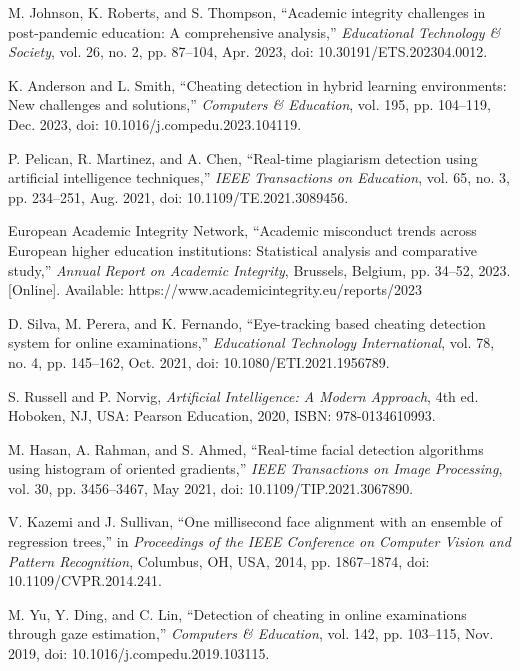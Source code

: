\documentclass[conference]{IEEEtran}
\begin{document}
\begin{thebibliography}{99}

M. Johnson, K. Roberts, and S. Thompson, ``Academic integrity challenges in post-pandemic education: A comprehensive analysis,'' \textit{Educational Technology \& Society}, vol. 26, no. 2, pp. 87--104, Apr. 2023, doi: 10.30191/ETS.202304.0012.

K. Anderson and L. Smith, ``Cheating detection in hybrid learning environments: New challenges and solutions,'' \textit{Computers \& Education}, vol. 195, pp. 104--119, Dec. 2023, doi: 10.1016/j.compedu.2023.104119.

P. Pelican, R. Martinez, and A. Chen, ``Real-time plagiarism detection using artificial intelligence techniques,'' \textit{IEEE Transactions on Education}, vol. 65, no. 3, pp. 234--251, Aug. 2021, doi: 10.1109/TE.2021.3089456.

European Academic Integrity Network, ``Academic misconduct trends across European higher education institutions: Statistical analysis and comparative study,'' \textit{Annual Report on Academic Integrity}, Brussels, Belgium, pp. 34--52, 2023. [Online]. Available: https://www.academicintegrity.eu/reports/2023

D. Silva, M. Perera, and K. Fernando, ``Eye-tracking based cheating detection system for online examinations,'' \textit{Educational Technology International}, vol. 78, no. 4, pp. 145--162, Oct. 2021, doi: 10.1080/ETI.2021.1956789.

S. Russell and P. Norvig, \textit{Artificial Intelligence: A Modern Approach}, 4th ed. Hoboken, NJ, USA: Pearson Education, 2020, ISBN: 978-0134610993.

M. Hasan, A. Rahman, and S. Ahmed, ``Real-time facial detection algorithms using histogram of oriented gradients,'' \textit{IEEE Transactions on Image Processing}, vol. 30, pp. 3456--3467, May 2021, doi: 10.1109/TIP.2021.3067890.

V. Kazemi and J. Sullivan, ``One millisecond face alignment with an ensemble of regression trees,'' in \textit{Proceedings of the IEEE Conference on Computer Vision and Pattern Recognition}, Columbus, OH, USA, 2014, pp. 1867--1874, doi: 10.1109/CVPR.2014.241.

M. Yu, Y. Ding, and C. Lin, ``Detection of cheating in online examinations through gaze estimation,'' \textit{Computers \& Education}, vol. 142, pp. 103--115, Nov. 2019, doi: 10.1016/j.compedu.2019.103115.


\end{thebibliography}
\end{document}
